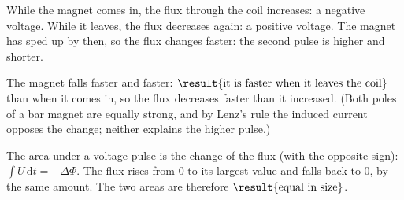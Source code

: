 \begin{abcliste}
\abc While the magnet comes in, the flux through the coil increases: a negative voltage. While it leaves, the flux decreases again: a positive voltage. The magnet has sped up by then, so the flux changes faster: the second pulse is higher and shorter.
\begin{center}
\end{center}

\abc The magnet falls faster and faster: $\result{\text{it is faster when it leaves the coil}}$ than when it comes in, so the flux decreases faster than it increased. (Both poles of a bar magnet are equally strong, and by Lenz's rule the induced current opposes the change; neither explains the higher pulse.)

\abc The area under a voltage pulse is the change of the flux (with the opposite sign): $\int U\,\mathrm{d}t = -\Delta\Phi$. The flux rises from 0 to its largest value and falls back to 0, by the same amount. The two areas are therefore $\result{\text{equal in size}}$.
\end{abcliste}
